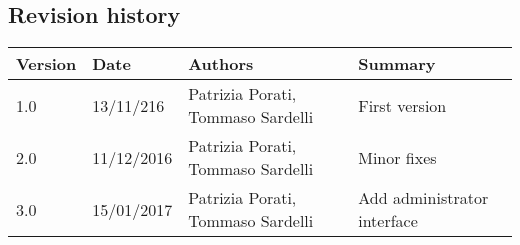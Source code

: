 \subsection{Revision history}
\begin{tabular}{|l|l|l|l|}
	\hline
	\textbf{Version}	& \textbf{Date}	& \textbf{Authors}	& \textbf{Summary}\\
	\hline
	1.0 	& 13/11/216 	& Patrizia Porati, Tommaso Sardelli 	& First version\\
	\hline
	2.0 	& 11/12/2016 	& Patrizia Porati, Tommaso Sardelli 	& Minor fixes\\
	\hline
	3.0		& 15/01/2017 	& Patrizia Porati, Tommaso Sardelli 	& Add administrator interface\\
	\hline
\end{tabular}